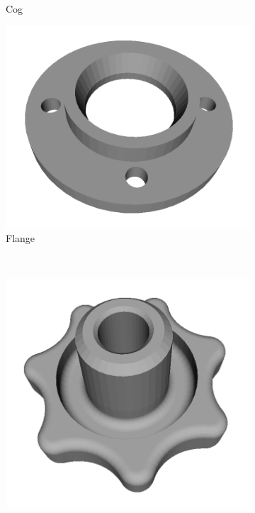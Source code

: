 \begin{figure}[t]
\begin{subfigure}[b]{0.19\linewidth}
		\caption{Cog}
	\end{subfigure}
	\begin{subfigure}[b]{0.19\linewidth} \centering
		\includegraphics[width=1\linewidth]{./fig/eval/toshiba_flange1.png}
		\caption{Flange}
	\end{subfigure} \\ 
	\begin{subfigure}[b]{0.19\linewidth} \centering
		\includegraphics[width=1\linewidth]{./fig/eval/toshiba_knob1.png}

\end{subfigure}
\end{figure}

